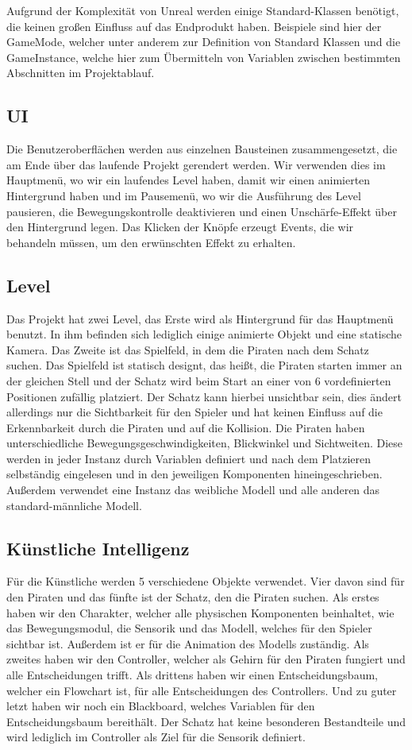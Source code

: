 \documentclass[
	12pt, %
	a4paper,
	listof=totoc, %
	bibliography=totoc, %
	numbers=noenddot, %
	ngerman, %
	headsepline, %
	oneside %
	]{scrbook} %
\begin{document}
Aufgrund der Komplexität von Unreal werden einige Standard-Klassen benötigt, die keinen großen Einfluss auf das Endprodukt haben. Beispiele sind hier der GameMode, welcher unter anderem zur Definition von Standard Klassen und die GameInstance, welche hier zum Übermitteln von Variablen zwischen bestimmten Abschnitten im Projektablauf.

\subsection{UI}
Die Benutzeroberflächen werden aus einzelnen Bausteinen zusammengesetzt, die am Ende über das laufende Projekt gerendert werden. Wir verwenden dies im Hauptmenü, wo wir ein laufendes Level haben, damit wir einen animierten Hintergrund haben und im Pausemenü, wo wir die Ausführung des Level pausieren, die Bewegungskontrolle deaktivieren und einen Unschärfe-Effekt über den Hintergrund legen. Das Klicken der Knöpfe erzeugt Events, die wir behandeln müssen, um den erwünschten Effekt zu erhalten.


\subsection{Level}
Das Projekt hat zwei Level, das Erste wird als Hintergrund für das Hauptmenü benutzt. In ihm befinden sich lediglich einige animierte Objekt und eine statische Kamera. Das Zweite ist das Spielfeld, in dem die Piraten nach dem Schatz suchen. Das Spielfeld ist statisch designt, das heißt, die Piraten starten immer an der gleichen Stell und der Schatz wird beim Start an einer von 6 vordefinierten Positionen zufällig platziert. Der Schatz kann hierbei unsichtbar sein, dies ändert allerdings nur die Sichtbarkeit für den Spieler und hat keinen Einfluss auf die Erkennbarkeit durch die Piraten und auf die Kollision. Die Piraten haben unterschiedliche Bewegungsgeschwindigkeiten, Blickwinkel und Sichtweiten. Diese werden in jeder Instanz durch Variablen definiert und nach dem Platzieren selbständig eingelesen und in den jeweiligen Komponenten hineingeschrieben. Außerdem verwendet eine Instanz das weibliche Modell und alle anderen das standard-männliche Modell.

\subsection{Künstliche Intelligenz}
Für die Künstliche werden 5  verschiedene Objekte verwendet. Vier davon sind für den Piraten und das fünfte ist der Schatz, den die Piraten suchen. Als erstes haben wir den Charakter, welcher alle physischen Komponenten beinhaltet, wie das Bewegungsmodul, die Sensorik und das Modell, welches für den Spieler sichtbar ist. Außerdem ist er für die Animation des Modells zuständig. Als zweites haben wir den Controller, welcher als Gehirn für den Piraten fungiert und alle Entscheidungen trifft. Als drittens haben wir einen Entscheidungsbaum, welcher ein Flowchart ist, für alle Entscheidungen des Controllers.  Und zu guter letzt haben wir noch ein 
Blackboard, welches Variablen für den Entscheidungsbaum bereithält. Der Schatz hat keine besonderen Bestandteile und wird lediglich im Controller als Ziel für die Sensorik definiert.
\end{document}
